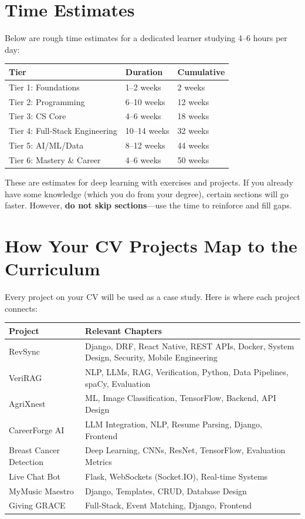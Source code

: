 \documentclass[12pt, a4paper, oneside]{book}
\begin{document}
\newpage

\section{Time Estimates}

Below are rough time estimates for a dedicated learner studying 4--6 hours per day:

\begin{center}
\begin{tabular}{l l l}
\toprule
\textbf{Tier} & \textbf{Duration} & \textbf{Cumulative} \\
\midrule
Tier 1: Foundations & 1--2 weeks & 2 weeks \\
Tier 2: Programming & 6--10 weeks & 12 weeks \\
Tier 3: CS Core & 4--6 weeks & 18 weeks \\
Tier 4: Full-Stack Engineering & 10--14 weeks & 32 weeks \\
Tier 5: AI/ML/Data & 8--12 weeks & 44 weeks \\
Tier 6: Mastery \& Career & 4--6 weeks & 50 weeks \\
\bottomrule
\end{tabular}
\end{center}

\begin{notebox}
These are estimates for deep learning with exercises and projects. If you already have some knowledge (which you do from your degree), certain sections will go faster. However, \textbf{do not skip sections}---use the time to reinforce and fill gaps.
\end{notebox}

\section{How Your CV Projects Map to the Curriculum}

Every project on your CV will be used as a case study. Here is where each project connects:

\begin{longtable}{p{} p{}}
\toprule
\textbf{Project} & \textbf{Relevant Chapters} \\
\midrule
\endhead
RevSync & Django, DRF, React Native, REST APIs, Docker, System Design, Security, Mobile Engineering \\
VeriRAG & NLP, LLMs, RAG, Verification, Python, Data Pipelines, spaCy, Evaluation \\
AgriXnest & ML, Image Classification, TensorFlow, Backend, API Design \\
CareerForge AI & LLM Integration, NLP, Resume Parsing, Django, Frontend \\
Breast Cancer Detection & Deep Learning, CNNs, ResNet, TensorFlow, Evaluation Metrics \\
Live Chat Bot & Flask, WebSockets (Socket.IO), Real-time Systems \\
MyMusic Maestro & Django, Templates, CRUD, Database Design \\
Giving GRACE & Full-Stack, Event Matching, Django, Frontend \\
\bottomrule
\end{longtable}
\end{document}
